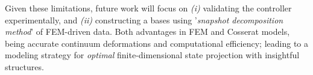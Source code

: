 Given these limitations, future work will focus on \textit{(i)} validating the controller experimentally, and \textit{(ii)} constructing a bases using '\emph{snapshot decomposition method}' of FEM-driven data. %
Both advantages in FEM and Cosserat models, being accurate continuum deformations and computational efficiency; leading to a modeling strategy for \textit{optimal} finite-dimensional state projection with insightful structures.%
